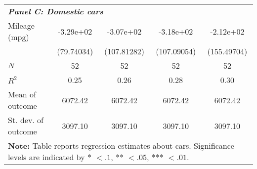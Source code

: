 {\begin{tabular}{l*{4}{c}}
\hline
\multicolumn{5}{l}{\linebreak \textbf{\textit{Panel C: Domestic cars}}} \\
Mileage (mpg)       &   -3.29e+02\sym{***}&   -3.07e+02\sym{***}&   -3.18e+02\sym{***}&   -2.12e+02         \\
&  (79.74034)         & (107.81282)         & (107.09054)         & (155.49704)         \\
\hline
$N$                 &          52         &          52         &          52         &          52         \\
$R^2$               &        0.25         &        0.26         &        0.28         &        0.30         \\
Mean of outcome     &     6072.42         &     6072.42         &     6072.42         &     6072.42         \\
St. dev. of outcome &     3097.10         &     3097.10         &     3097.10         &     3097.10         \\
\hline\hline
\multicolumn{5}{l}{\footnotesize \begin{minipage}{.8\linewidth} \footnotesize \smallskip \textbf{Note:} Table reports regression estimates about cars. Significance levels are indicated by $*$ $<.1$, ** $<.05$,  *** $<.01$.   \end{minipage}}\\
\end{tabular}
}
